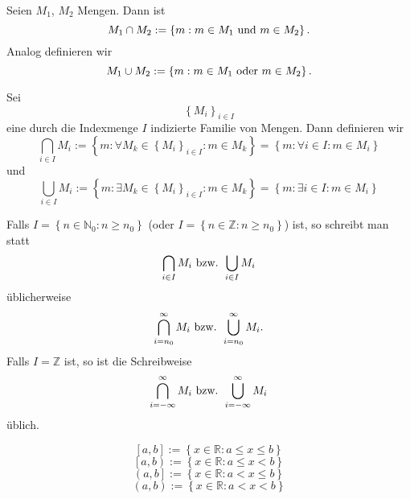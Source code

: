 \documentclass[10pt]{scrbook}
\begin{document}
\begin{Def}Seien $M_1$, $M_2$ Mengen. Dann ist 
\begin{displaymath}
M_1\cap M_2:=\left\{m: m\in M_1 \textnormal{ und } m\in M_2\right\}.
\end{displaymath}
Analog definieren wir 
\begin{displaymath}
M_1\cup M_2:=\left\{m: m\in M_1 \textnormal{ oder } m\in M_2\right\}.
\end{displaymath}
\end{Def}
\begin{Def}Sei
\begin{displaymath}
	\left\{M_i\right\}_{i\in I}
\end{displaymath}
eine durch die Indexmenge $I$ indizierte Familie von Mengen. Dann definieren wir 
\begin{displaymath}
\bigcap\limits_{i\in I}{M_i}:=\left\{m: \forall M_k\in\left\{M_i\right\}_{i\in I}: m\in M_k\right\}=\left\{m: \forall i\in I: m\in M_i\right\}
\end{displaymath}
und
\begin{displaymath}
\bigcup\limits_{i\in I}{M_i}:=\left\{m: \exists M_k\in\left\{M_i\right\}_{i\in I}: m\in M_k\right\}=\left\{m: \exists i\in I: m\in M_i\right\}
\end{displaymath}\end{Def}
\begin{Bem}
	Falls $I=\left\{n\in \mathbb{N}_0: n\geq n_0\right\}$ (oder $I=\left\{n\in \mathbb{Z}: n\geq n_0\right\}$) ist, so schreibt man statt
\begin{displaymath}
	\bigcap\limits_{i\in I}{M_i}\textnormal{ bzw. }\bigcup\limits_{i\in I}{M_i}
\end{displaymath}
üblicherweise
\begin{displaymath}
	\bigcap\limits_{i=n_0}^\infty{M_i}\textnormal{ bzw. }\bigcup\limits_{i=n_0}^\infty{M_i}.
\end{displaymath}
Falls $I=\mathbb{Z}$ ist, so ist die Schreibweise
\begin{displaymath}
	\bigcap\limits_{i=-\infty}^\infty{M_i}\textnormal{ bzw. }\bigcup\limits_{i=-\infty}^\infty{M_i}
\end{displaymath}
üblich.
\end{Bem}
\begin{Def}
\begin{displaymath}
	\left[a, b\right]:=\left\{x\in \mathbb{R}: a\leq x\leq b\right\}
\end{displaymath}
\begin{displaymath}
	\left[a, b\right):=\left\{x\in \mathbb{R}: a\leq x< b\right\}
\end{displaymath}
\begin{displaymath}
 \left(a, b\right]:=\left\{x\in \mathbb{R}: a< x\leq b\right\}
\end{displaymath}
\begin{displaymath}
	\left(a, b\right):=\left\{x\in \mathbb{R}: a< x< b\right\}
\end{displaymath}
\end{Def}
\end{document}

